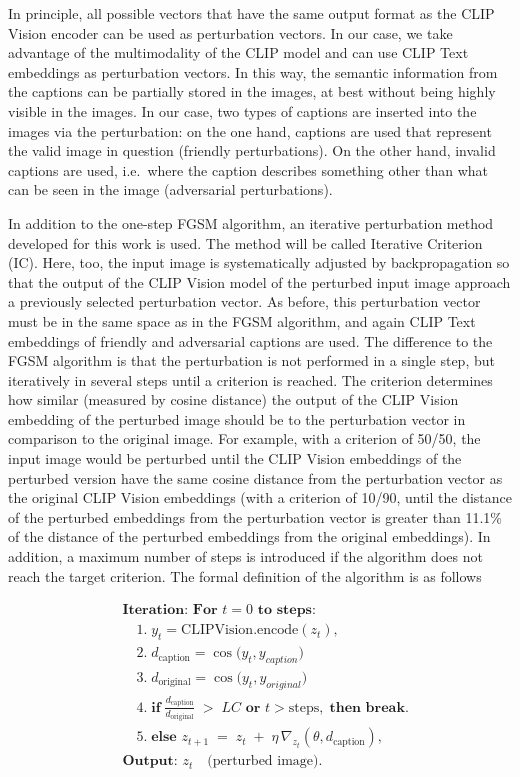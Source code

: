 In principle, all possible vectors that have the same output format as the CLIP Vision encoder can be used as perturbation vectors. In our case, we take advantage of the multimodality of the CLIP model and can use CLIP Text embeddings as perturbation vectors. In this way, the semantic information from the captions can be partially stored in the images, at best without being highly visible in the images. In our case, two types of captions are inserted into the images via the perturbation: on the one hand, captions are used that represent the valid image in question (friendly perturbations). On the other hand, invalid captions are used, i.e.\ where the caption describes something other than what can be seen in the image (adversarial perturbations). 

In addition to the one-step FGSM algorithm, an iterative perturbation method developed for this work is used. The method will be called Iterative Criterion (IC). Here, too, the input image is systematically adjusted by backpropagation so that the output of the CLIP Vision model of the perturbed input image approach a previously selected perturbation vector. As before, this perturbation vector must be in the same space as in the FGSM algorithm, and again CLIP Text embeddings of friendly and adversarial captions are used. The difference to the FGSM algorithm is that the perturbation is not performed in a single step, but iteratively in several steps until a criterion is reached. The criterion determines how similar (measured by cosine distance) the output of the CLIP Vision embedding of the perturbed image should be to the perturbation vector in comparison to the original image. For example, with a criterion of 50/50, the input image would be perturbed until the CLIP Vision embeddings of the perturbed version have the same cosine distance from the perturbation vector as the original CLIP Vision embeddings (with a criterion of 10/90, until the distance of the perturbed embeddings from the perturbation vector is greater than 11.1\% of the distance of the perturbed embeddings from the original embeddings). In addition, a maximum number of steps is introduced if the algorithm does not reach the target criterion. The formal definition of the algorithm is as follows 

\[
\begin{aligned}
& \textbf{Iteration: For } t = 0 \textbf{ to steps:}\\
& \quad 1.\; y_t = \mathrm{CLIP Vision.encode}(z_t), \\[4pt]
& \quad 2.\; d_{\text{caption}} = \cos \bigl(y_t, y_{caption} \bigr) \\[4pt]
& \quad 3.\; d_{\text{original}} = \cos \bigl(y_t, y_{original} \bigr) \\[4pt]
& \quad 4.\; \textbf{if} \;\frac{d_{\text{caption}}}{d_{\text{original}}} 
\;>\; LC \textbf{ or } t > \text{steps}, \;\textbf{then break}.\\[6pt]
& \quad 5.\; \textbf{else } z_{t+1} 
\;=\; z_t \;+\; \eta \,\nabla_{z_t} (\theta, d_{\text{caption}}), \\[4pt]
%
& \textbf{Output: } z_t \quad \text{(perturbed image)}.
\end{aligned}
\]

